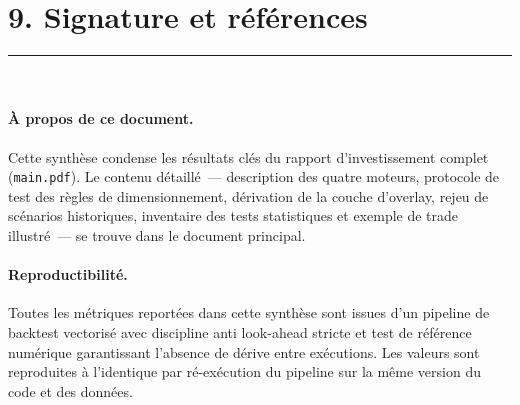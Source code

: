 \documentclass[11pt, a4paper]{scrartcl}
\begin{document}
\section*{9. Signature et références}
\vspace{-0.4em}
{\color{accent}\rule{\linewidth}{1.0pt}}\\[0.4em]

\paragraph{À propos de ce document.} Cette synthèse condense les résultats clés du
rapport d'investissement complet (\texttt{main.pdf}). Le contenu détaillé~---
description des quatre moteurs, protocole de test des règles de dimensionnement,
dérivation de la couche d'overlay, rejeu de scénarios historiques, inventaire des
tests statistiques et exemple de trade illustré~--- se trouve dans le document
principal.

\paragraph{Reproductibilité.} Toutes les métriques reportées dans cette synthèse sont
issues d'un pipeline de backtest vectorisé avec discipline anti look-ahead stricte et
test de référence numérique garantissant l'absence de dérive entre exécutions. Les
valeurs sont reproduites à l'identique par ré-exécution du pipeline sur la même
version du code et des données.

\vfill

\noindent\colorbox{softBlue}{%
}

\vspace{0.6cm}

\noindent\colorbox{lightGrey}{%
}
\end{document}
